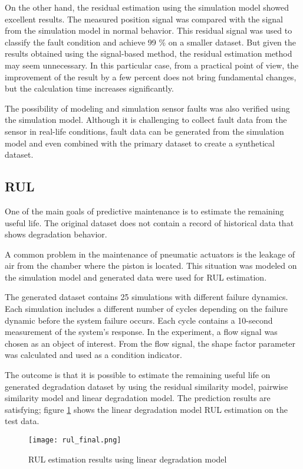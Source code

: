 On the other hand, the residual estimation using the simulation model
showed excellent results. The measured position signal was compared with
the signal from the simulation model in normal behavior. This residual
signal was used to classify the fault condition and achieve  99 \% on a
smaller dataset.  But given the results obtained using the signal-based
method, the residual estimation method may seem unnecessary. In this
particular case, from a practical point of view, the improvement of the
result by a few percent does not bring fundamental changes, but the
calculation time increases significantly. 

The possibility of modeling and simulation sensor faults was also verified
using the simulation model. Although it is challenging to collect fault
data from the sensor in real-life conditions, fault data can be generated
from the simulation model and even combined with the primary dataset to
create a synthetical dataset.

\subsection{RUL}
One of the main goals of predictive maintenance is to estimate the
remaining useful life. The original dataset does not contain a record of
historical data that shows degradation behavior. 

A common problem in the maintenance of pneumatic actuators is the leakage
of air from the chamber where the piston is located. This situation was
modeled on the simulation model and generated data were used for RUL
estimation. 

The generated dataset contains 25 simulations with different failure
dynamics. Each simulation includes a different number of cycles depending
on the failure dynamic before the system failure occurs.  Each cycle
contains a 10-second measurement of the system's response.  In the
experiment, a flow signal was chosen as an object of interest. From the
flow signal, the shape factor parameter was calculated and used as a
condition indicator. 

The outcome is that it is possible to estimate the remaining useful life on
generated degradation dataset by using the residual similarity model,
pairwise similarity model and linear degradation model. The prediction
results are satisfying; figure \ref{fig:rul_final} shows the linear
degradation model RUL estimation on the test data.

\begin{figure}[h!]
    \centering
    \texttt{[image: rul\_final.png]}
    \caption{RUL estimation results using linear degradation model}
    \label{fig:rul_final}
\end{figure}

